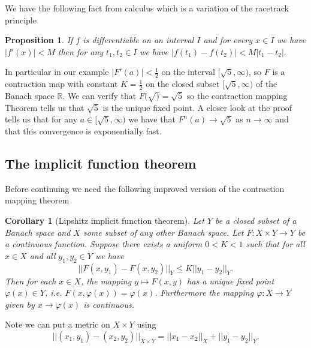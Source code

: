 \documentclass[10pt]{article}
\newtheorem{cor}[thm]{Corollary}
\newtheorem{prop}[thm]{Proposition}
\theoremstyle{definition}
\theoremstyle{remark}
\begin{document}
  We have the following fact from calculus which is a variation of the racetrack principle
  \begin{prop}
    If $f$ is differentiable on an interval $I$ and for every $x \in I$ we have $|f'(x)|<M$ then for any $t_1,t_2 \in I$ we have $|f(t_1)-f(t_2)| < M|t_1-t_2|.$
  \end{prop}

  In particular in our example $|F'(a)| < \frac 1 2$ on the interval $[\sqrt 5,\infty)$, so $F$ is a contraction map with constant $K = \frac 1 2$ on the closed subset $[\sqrt 5,\infty)$ of the Banach space $\mathbb R$. We can verify that $F(\sqrt)=\sqrt 5$ so the contraction mapping Theorem  tells us that $\sqrt 5$ is the unique fixed point. A closer look at the proof tells us that for any $a \in [\sqrt 5,\infty)$ we have that $F^n(a) \to \sqrt 5$ as $n\to \infty$ and that this convergence is exponentially fast.

  \subsection{The implicit function theorem}
  Before continuing we need the following improved version of the contraction mapping theorem
  
\begin{cor}[Lipshitz implicit function theorem]\label{cor:lipschitz-fp}
  Let $Y$ be a closed subset of a Banach space and $X$ some subset of any other Banach space. Let $F:X\times Y \to Y$ be a continuous function. Suppose there exists a uniform $0<K<1$ such that for all $x \in X$ and all $y_1,y_2\in Y$ we have \[
    ||F(x,y_1) - F(x,y_2)||_Y \leq K ||y_1-y_2||_Y.
  \] Then for each $x \in X$, the mapping $y \mapsto F(x,y)$ has a unique fixed point $\varphi(x)\in Y$, i.e. $F(x,\varphi(x))=\varphi(x)$. Furthermore the mapping $\varphi: X \to Y$ given by $x \to \varphi(x)$ is continuous. 
\end{cor}

Note we can put a metric on $X\times Y$ using\[
  ||(x_1,y_1)-(x_2,y_2)||_{X\times Y} = ||x_1-x_2||_X+||y_1-y_2||_Y.
  \]
\end{document}
